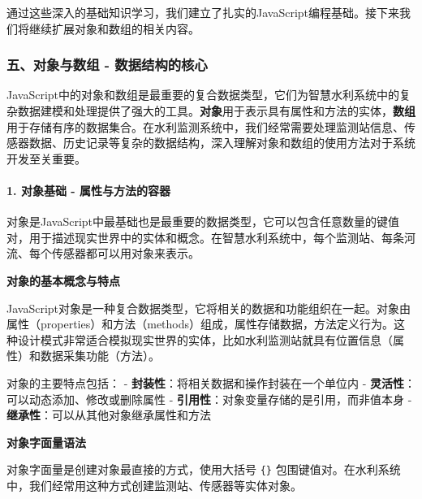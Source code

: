 通过这些深入的基础知识学习，我们建立了扎实的JavaScript编程基础。接下来我们将继续扩展对象和数组的相关内容。

\subsubsection{五、对象与数组 - 数据结构的核心}\label{ux4e94ux5bf9ux8c61ux4e0eux6570ux7ec4---ux6570ux636eux7ed3ux6784ux7684ux6838ux5fc3}

JavaScript中的对象和数组是最重要的复合数据类型，它们为智慧水利系统中的复杂数据建模和处理提供了强大的工具。\textbf{对象}用于表示具有属性和方法的实体，\textbf{数组}用于存储有序的数据集合。在水利监测系统中，我们经常需要处理监测站信息、传感器数据、历史记录等复杂的数据结构，深入理解对象和数组的使用方法对于系统开发至关重要。

\paragraph{1. 对象基础 - 属性与方法的容器}\label{ux5bf9ux8c61ux57faux7840---ux5c5eux6027ux4e0eux65b9ux6cd5ux7684ux5bb9ux5668}

对象是JavaScript中最基础也是最重要的数据类型，它可以包含任意数量的键值对，用于描述现实世界中的实体和概念。在智慧水利系统中，每个监测站、每条河流、每个传感器都可以用对象来表示。

\textbf{对象的基本概念与特点}

JavaScript对象是一种复合数据类型，它将相关的数据和功能组织在一起。对象由属性（properties）和方法（methods）组成，属性存储数据，方法定义行为。这种设计模式非常适合模拟现实世界的实体，比如水利监测站就具有位置信息（属性）和数据采集功能（方法）。

对象的主要特点包括： - \textbf{封装性}：将相关数据和操作封装在一个单位内 - \textbf{灵活性}：可以动态添加、修改或删除属性 - \textbf{引用性}：对象变量存储的是引用，而非值本身 - \textbf{继承性}：可以从其他对象继承属性和方法

\textbf{对象字面量语法}

对象字面量是创建对象最直接的方式，使用大括号 \texttt{\{\}} 包围键值对。在水利系统中，我们经常用这种方式创建监测站、传感器等实体对象。

\begin{Shaded}
\begin{Highlighting}[]
\OperatorTok{=}\NormalTok{ \{}
    \OperatorTok{:} \OperatorTok{,}
    \OperatorTok{:} \OperatorTok{,}
    \OperatorTok{:} \OperatorTok{,}
    \OperatorTok{:} 
\NormalTok{\}}\OperatorTok{;}
\end{Highlighting}
\end{Shaded}

